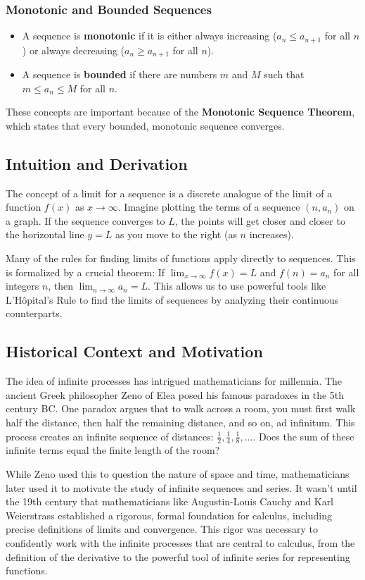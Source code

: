 \documentclass{article}
\begin{document}
\subsubsection{Monotonic and Bounded Sequences}
\begin{itemize}
    \item A sequence is \textbf{monotonic} if it is either always increasing ($a_n \le a_{n+1}$ for all $n$) or always decreasing ($a_n \ge a_{n+1}$ for all $n$).
    \item A sequence is \textbf{bounded} if there are numbers $m$ and $M$ such that $m \le a_n \le M$ for all $n$.
\end{itemize}
These concepts are important because of the \textbf{Monotonic Sequence Theorem}, which states that every bounded, monotonic sequence converges.

\subsection{Intuition and Derivation}
The concept of a limit for a sequence is a discrete analogue of the limit of a function $f(x)$ as $x \to \infty$. Imagine plotting the terms of a sequence $(n, a_n)$ on a graph. If the sequence converges to $L$, the points will get closer and closer to the horizontal line $y=L$ as you move to the right (as $n$ increases).

Many of the rules for finding limits of functions apply directly to sequences. This is formalized by a crucial theorem: If $\lim_{x \to \infty} f(x) = L$ and $f(n) = a_n$ for all integers $n$, then $\lim_{n \to \infty} a_n = L$. This allows us to use powerful tools like L'Hôpital's Rule to find the limits of sequences by analyzing their continuous counterparts.

\subsection{Historical Context and Motivation}
The idea of infinite processes has intrigued mathematicians for millennia. The ancient Greek philosopher Zeno of Elea posed his famous paradoxes in the 5th century BC. One paradox argues that to walk across a room, you must first walk half the distance, then half the remaining distance, and so on, ad infinitum. This process creates an infinite sequence of distances: $\frac{1}{2}, \frac{1}{4}, \frac{1}{8}, \dots$. Does the sum of these infinite terms equal the finite length of the room?

While Zeno used this to question the nature of space and time, mathematicians later used it to motivate the study of infinite sequences and series. It wasn't until the 19th century that mathematicians like Augustin-Louis Cauchy and Karl Weierstrass established a rigorous, formal foundation for calculus, including precise definitions of limits and convergence. This rigor was necessary to confidently work with the infinite processes that are central to calculus, from the definition of the derivative to the powerful tool of infinite series for representing functions.
\end{document}
